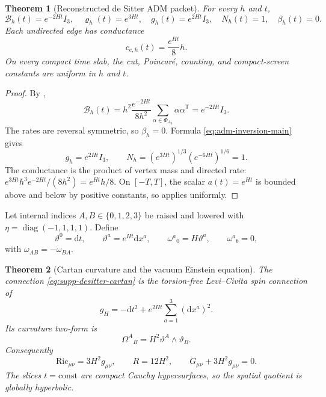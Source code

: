 \documentclass[11pt]{article}
\newtheorem{theorem}{Theorem}[section]
\numberwithin{equation}{section}
\theoremstyle{definition}
\theoremstyle{remark}
\newcommand{\dd}{\mathrm d}
\newcommand{\diag}{\operatorname{diag}}
\newcommand{\Ric}{\mathrm{Ric}}
\begin{document}
\begin{theorem}[Reconstructed de Sitter ADM packet]
\label{thm:supp-desitter-adm}
For every $h$ and $t$,
\begin{equation}
 \mathcal B_h(t)=e^{-2Ht}I_3,
 \quad
 \varrho_h(t)=e^{3Ht},
 \quad
 g_h(t)=e^{2Ht}I_3,
 \quad
 N_h(t)=1,
 \quad
 \beta_h(t)=0.
 \label{eq:supp-desitter-adm}
\end{equation}
Each undirected edge has conductance
\begin{equation}
 c_{e,h}(t)=\frac{e^{Ht}}8h.
 \label{eq:supp-desitter-conductance}
\end{equation}
On every compact time slab, the cut, Poincar\'e, counting, and compact-screen
constants are uniform in $h$ and $t$.
\end{theorem}

\begin{proof}
By ,
\[
 \mathcal B_h(t)
 =h^2\frac{e^{-2Ht}}{8h^2}
  \sum_{\alpha\in\Phi_{A_3}}\alpha\alpha^{\mathsf T}
 =e^{-2Ht}I_3.
\]
The rates are reversal symmetric, so $\beta_h=0$.  Formula
\eqref{eq:adm-inversion-main} gives
\[
 g_h=e^{2Ht}I_3,
 \qquad
 N_h=(e^{3Ht})^{1/3}(e^{-6Ht})^{1/6}=1.
\]
The conductance is the product of vertex mass and directed rate:
$e^{3Ht}h^3e^{-2Ht}/(8h^2)=e^{Ht}h/8$.  On $[-T,T]$, the scalar
$a(t)=e^{Ht}$ is bounded above and below by positive constants, so
 applies uniformly.
\end{proof}

Let internal indices $A,B\in\{0,1,2,3\}$ be raised and lowered with
$\eta=\diag(-1,1,1,1)$.  Define
\begin{equation}
 \vartheta^0=\dd t,
 \qquad
 \vartheta^a=e^{Ht}\dd x^a,
 \qquad
 \omega^a{}_0=H\vartheta^a,
 \qquad
 \omega^a{}_b=0,
 \label{eq:supp-desitter-cartan}
\end{equation}
with $\omega_{AB}=-\omega_{BA}$.

\begin{theorem}[Cartan curvature and the vacuum Einstein equation]
\label{thm:supp-desitter-einstein}
The connection \eqref{eq:supp-desitter-cartan} is the torsion-free
Levi--Civita spin connection of
\begin{equation}
 g_H=-\dd t^2+e^{2Ht}\sum_{a=1}^3(\dd x^a)^2.
 \label{eq:supp-desitter-metric}
\end{equation}
Its curvature two-form is
\begin{equation}
 \Omega^A{}_B=H^2\vartheta^A\wedge\vartheta_B.
 \label{eq:supp-desitter-curvature}
\end{equation}
Consequently
\begin{equation}
 \Ric_{\mu\nu}=3H^2g_{\mu\nu},
 \qquad
 R=12H^2,
 \qquad
 G_{\mu\nu}+3H^2g_{\mu\nu}=0.
 \label{eq:supp-desitter-einstein}
\end{equation}
The slices $t=\mathrm{const}$ are compact Cauchy hypersurfaces, so the spatial
quotient is globally hyperbolic.
\end{theorem}
\end{document}
